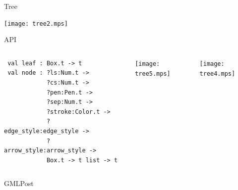 \documentclass{beamer}
\begin{document}
\begin{frame}{Tree}
  \begin{center}
    \texttt{[image: tree2.mps]}
  \end{center}
\end{frame}

\begin{frame}[fragile]{API}
  \begin{columns}
  \begin{verbatim}
 val leaf : Box.t -> t
 val node : ?ls:Num.t -> 
            ?cs:Num.t -> 
            ?pen:Pen.t -> 
            ?sep:Num.t ->
            ?stroke:Color.t -> 
            ?edge_style:edge_style -> 
            ?arrow_style:arrow_style -> 
            Box.t -> t list -> t
  \end{verbatim}
    \texttt{[image: tree5.mps]}

    \bigskip
    \bigskip
    \texttt{[image: tree4.mps]}
    \end{columns}
\end{frame}

\begin{frame}{GMLPost}
\end{frame}

  
\end{document}
